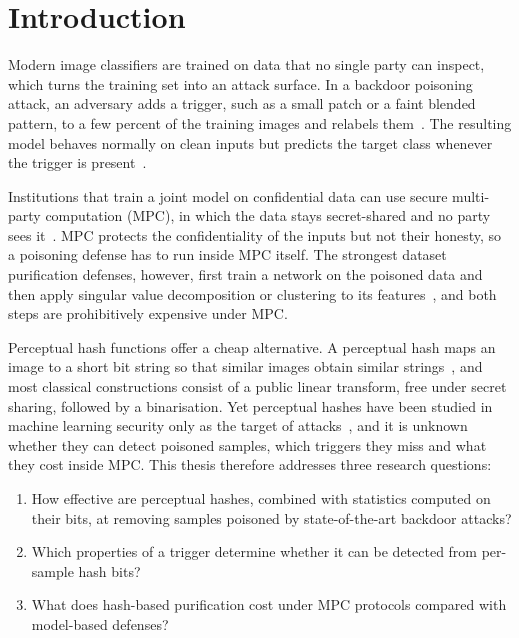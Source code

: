 \chapter{Introduction}
\label{chap:intro}

Modern image classifiers are trained on data that no single party can inspect,
which turns the training set into an attack surface. In a backdoor poisoning
attack, an adversary adds a trigger, such as a small patch or a faint blended
pattern, to a few percent of the training images and relabels
them~\cite{gu2019badnets,chen2017blended}. The resulting model behaves normally
on clean inputs but predicts the target class whenever the trigger is
present~\cite{li2024backdoorsurvey}.

Institutions that train a joint model on confidential data can use secure
multi-party computation (MPC), in which the data stays secret-shared and no
party sees it~\cite{mohassel2018aby3,knott2021crypten}. MPC protects the
confidentiality of the inputs but not their honesty, so a poisoning defense has
to run inside MPC itself. The strongest dataset
purification defenses, however, first train a network on the poisoned data and
then apply singular value decomposition or clustering to its
features~\cite{tran2018spectral,chen2019activation}, and both steps are
prohibitively expensive under MPC.

Perceptual hash functions offer a cheap alternative. A perceptual hash maps an
image to a short bit string so that similar images obtain similar
strings~\cite{zauner2010phash}, and most classical constructions consist of a
public linear transform, free under secret sharing, followed by a
binarisation. Yet perceptual hashes have been studied in
machine learning security only as the target of
attacks~\cite{prokos2023squint}, and it is unknown whether they can detect
poisoned samples, which triggers they miss and what they cost inside MPC. This thesis therefore addresses three research questions:
\begin{enumerate}[label=\textbf{RQ\arabic*}, leftmargin=*, nosep]
  \item How effective are perceptual hashes, combined with statistics computed
    on their bits, at removing samples poisoned by state-of-the-art backdoor
    attacks?
  \item Which properties of a trigger determine whether it can be detected from
    per-sample hash bits?
  \item What does hash-based purification cost under MPC protocols compared with
    model-based defenses?
\end{enumerate}

